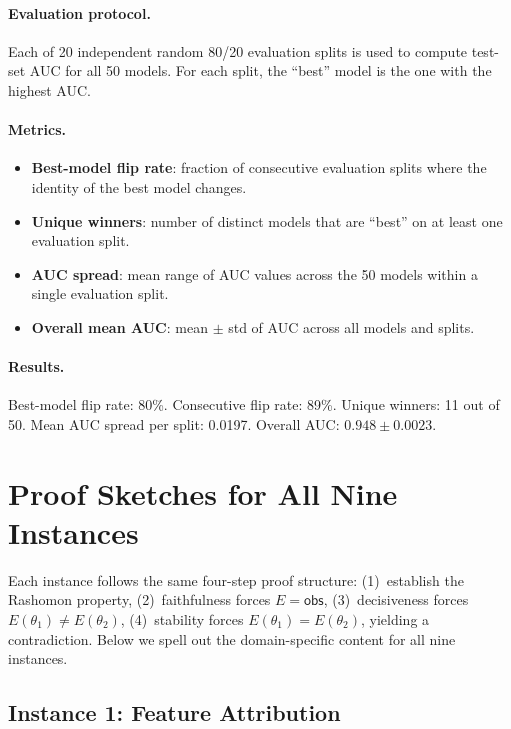 \documentclass[11pt,a4paper]{article}
\begin{document}
\paragraph{Evaluation protocol.}
Each of 20 independent random 80/20 evaluation splits is used to compute
test-set AUC for all 50 models.  For each split, the ``best'' model is the
one with the highest AUC.

\paragraph{Metrics.}
\begin{itemize}[nosep]
  \item \textbf{Best-model flip rate}: fraction of consecutive evaluation
    splits where the identity of the best model changes.
  \item \textbf{Unique winners}: number of distinct models that are ``best''
    on at least one evaluation split.
  \item \textbf{AUC spread}: mean range of AUC values across the 50 models
    within a single evaluation split.
  \item \textbf{Overall mean AUC}: mean $\pm$ std of AUC across all
    models and splits.
\end{itemize}

\paragraph{Results.}
Best-model flip rate: 80\%.  Consecutive flip rate: 89\%.  Unique winners:
11 out of 50.  Mean AUC spread per split: 0.0197.  Overall AUC:
$0.948 \pm 0.0023$.

\section{Proof Sketches for All Nine Instances}
\label{app:proof-sketches}

Each instance follows the same four-step proof structure: (1)~establish the
Rashomon property, (2)~faithfulness forces $E = \mathsf{obs}$,
(3)~decisiveness forces $E(\theta_1) \neq E(\theta_2)$,
(4)~stability forces $E(\theta_1) = E(\theta_2)$, yielding a contradiction.
Below we spell out the domain-specific content for all nine instances.

\subsection{Instance 1: Feature Attribution}
\label{app:proof-attribution}
\end{document}

